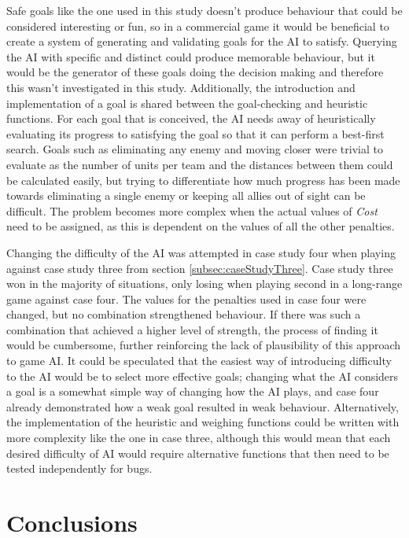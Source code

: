 \documentclass[11pt, a4paper]{report}
\begin{document}
Safe goals like the one used in this study doesn't produce behaviour that could be considered interesting or fun, so in a commercial game it would be beneficial to create a system of generating and validating goals for the AI to satisfy. Querying the AI with specific and distinct could produce memorable behaviour, but it would be the generator of these goals doing the decision making and therefore this wasn't investigated in this study. Additionally, the introduction and implementation of a goal is shared between the goal-checking and heuristic functions. For each goal that is conceived, the AI needs away of heuristically evaluating its progress to satisfying the goal so that it can perform a best-first search. Goals such as eliminating any enemy and moving closer were trivial to evaluate as the number of units per team and the distances between them could be calculated easily, but trying to differentiate how much progress has been made towards eliminating a single enemy or keeping all allies out of sight can be difficult. The problem becomes more complex when the actual values of \emph{Cost} need to be assigned, as this is dependent on the values of all the other penalties.

Changing the difficulty of the AI was attempted in case study four when playing against case study three from section \ref{subsec:caseStudyThree}. Case study three won in the majority of situations, only losing when playing second in a long-range game against case four. The values for the penalties used in case four were changed, but no combination strengthened behaviour. If there was such a combination that achieved a higher level of strength, the process of finding it would be cumbersome, further reinforcing the lack of plausibility of this approach to game AI. It could be speculated that the easiest way of introducing difficulty to the AI would be to select more effective goals; changing what the AI considers a goal is a somewhat simple way of changing how the AI plays, and case four already demonstrated how a weak goal resulted in weak behaviour. Alternatively, the implementation of the heuristic and weighing functions could be written with more complexity like the one in case three, although this would mean that each desired difficulty of AI would require alternative functions that then need to be tested independently for bugs.

\chapter{Conclusions}
\label{chapter:conclusions}
\end{document}
